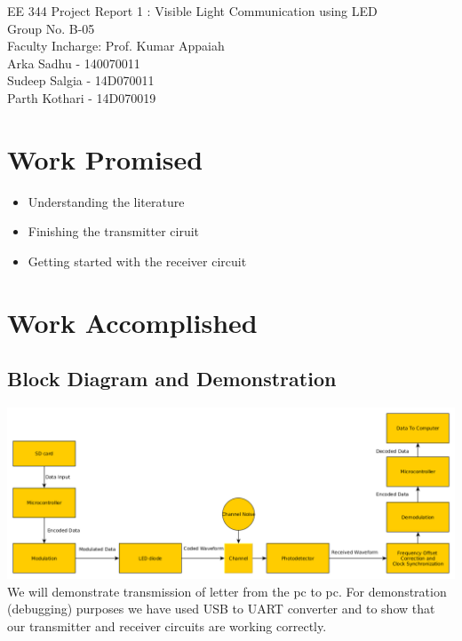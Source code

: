 \documentclass{article}
\begin{document}

EE 344 Project Report 1 : Visible Light Communication using LED\\
Group No. B-05\\
Faculty Incharge: Prof. Kumar Appaiah\\
Arka Sadhu - 140070011\\
Sudeep Salgia - 14D070011\\
Parth Kothari - 14D070019\\
\vspace{-1.0cm}

\section{Work Promised}

\begin{itemize}
\item Understanding the literature
\item Finishing the transmitter ciruit
\item Getting started with the receiver circuit
\end{itemize}

\section{Work Accomplished }

\subsection{Block Diagram and Demonstration}
\includegraphics[scale=0.3]{functional_flow}
\\We will demonstrate transmission of letter from the pc to pc. For demonstration (debugging) purposes we have used USB to UART converter
and to show that our transmitter and receiver circuits are working correctly.
\end{document}
